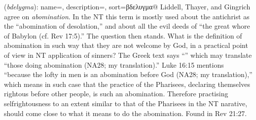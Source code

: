 \item[Abomination,]

(\textit{bdelygma}):
{
    name=,
    description={},
    sort=βδελυγμα@
}
Liddell, Thayer, and Gingrich agree on \emph{abomination}. 
In the NT this term is mostly used about the antichrist as the ``abomination of desolation,'' 
and about all the evil deeds of ``the great whore of Babylon (cf. Rev 17:5).'' 
The question then stands. What is the definition of abomination in such way that they are not welcome by God, in a practical
point of view in NT application of sinners? The Greek text says ``'' which may translate 
``those doing abomination (NA28; my translation).''
Luke 16:15 mentions ``because the lofty in men is an abomination before God (NA28; my translation),'' which means 
in such case that the practice of the Pharisees, declaring themselves rightous before other people, is such an abomination.
Therefore practising selfrightousness to an extent similar to that of the Pharisees in the NT narative, should come close to 
what it means to do the abomination.
Found in Rev 21:27.
